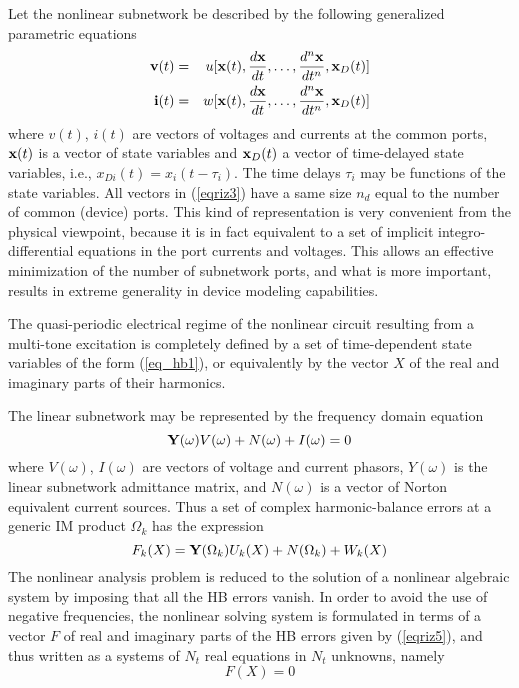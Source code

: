 Let the nonlinear subnetwork be described by the following generalized
parametric equations~\cite{rizzoli:92:1}
\begin{eqnarray}
  {\bf v}(t) &=& u[{\bf x}(t), \frac{d{\bf x}}{dt}, \dots , 
                 \frac{d^n{\bf x}}{dt^n}, {\bf x}_D(t)] \\
  {\bf i}(t) &=& w[{\bf x}(t), \frac{d{\bf x}}{dt}, \dots ,
                 \frac{d^n{\bf x}}{dt^n}, {\bf x}_D(t)] 
  \label{eqriz3}
\end{eqnarray}
where $v(t)$, $i(t)$ are vectors of voltages and currents at the
common ports, ${\bf x}(t)$ is a vector of state variables and ${\bf
x}_D(t)$ a vector of time-delayed state variables, i.e.,
$x_{Di}(t)=x_i(t-\tau_i)$. The time delays $\tau_i$ may be functions
of the state variables. All vectors in (\ref{eqriz3}) have a same size
$n_d$ equal to the number of common (device) ports. This kind of
representation is very convenient from the physical viewpoint, because
it is in fact equivalent to a set of implicit integro-differential
equations in the port currents and voltages. This allows an effective
minimization of the number of subnetwork ports, and what is more
important, results in extreme generality in device modeling
capabilities.

The quasi-periodic electrical regime of the nonlinear circuit
resulting from a multi-tone excitation is completely defined by a set of
time-dependent state variables of the form (\ref{eq_hb1}), or
equivalently by the vector $X$ of the real and imaginary parts of
their harmonics.

The linear subnetwork may be represented by the frequency domain
equation
\begin{equation}
  {\bf Y}(\omega) V(\omega) + N(\omega) + I(\omega) = 0 \label{eqriz4}
\end{equation}
where $V(\omega)$, $I(\omega)$ are vectors of voltage and current
phasors, $Y(\omega)$ is the linear subnetwork admittance matrix, and
$N(\omega)$ is a vector of Norton equivalent current sources. Thus a
set of complex harmonic-balance errors at a generic IM product
$\Omega_k$ has the expression
\begin{equation}
  F_k(X) = {\bf Y}(\Omega_k) U_k(X) + N(\Omega_k) + W_k(X) \label{eqriz5}
\end{equation}
The nonlinear analysis problem is reduced to the solution of a
nonlinear algebraic system by imposing that all the HB errors
vanish. In order to avoid the use of negative frequencies, the
nonlinear solving system is formulated in terms of a vector $F$ of
real and imaginary parts of the HB errors given by (\ref{eqriz5}), and
thus written as a systems of $N_t$ real equations in $N_t$ unknowns,
namely
\begin{equation}
  F(X) = 0 \label{eqriz6}
\end{equation}

